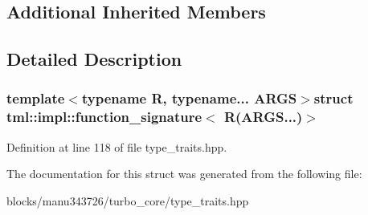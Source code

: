 \subsection*{Additional Inherited Members}


\subsection{Detailed Description}
\subsubsection*{template$<$typename R, typename... A\+R\+G\+S$>$struct tml\+::impl\+::function\+\_\+signature$<$ R(\+A\+R\+G\+S...)$>$}



Definition at line 118 of file type\+\_\+traits.\+hpp.



The documentation for this struct was generated from the following file\+:\begin{DoxyCompactItemize}
\item 
blocks/manu343726/turbo\+\_\+core/type\+\_\+traits.\+hpp\end{DoxyCompactItemize}

